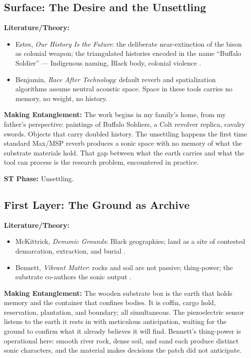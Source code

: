 \medskip

\subsection*{Surface: The Desire and the Unsettling}

\noindent\textbf{Literature/Theory:}
\begin{itemize}[noitemsep]
    \item Estes, \textit{Our History Is the Future}: the deliberate near-extinction of the bison as colonial weapon; the triangulated histories encoded in the name ``Buffalo Soldier'' — Indigenous naming, Black body, colonial violence \parencite{Estes_2019}.
    \item Benjamin, \textit{Race After Technology}: default reverb and spatialization algorithms assume neutral acoustic space. Space in these tools carries no memory, no weight, no history.
\end{itemize}

\noindent\textbf{Making Entanglement:} The work begins in my family's home, from my father's perspective: paintings of Buffalo Soldiers, a Colt revolver replica, cavalry swords. Objects that carry doubled history. The unsettling happens the first time standard Max/MSP reverb produces a sonic space with no memory of what the substrate materials hold. That gap between what the earth carries and what the tool can process is the research problem, encountered in practice.

\noindent\textbf{ST Phase:} Unsettling.

\medskip

\subsection*{First Layer: The Ground as Archive}

\noindent\textbf{Literature/Theory:}
\begin{itemize}[noitemsep]
    \item McKittrick, \textit{Demonic Grounds}: Black geographies; land as a site of contested demarcation, extraction, and burial \parencite{McKittrick_2006}.
    \item Bennett, \textit{Vibrant Matter}: rocks and soil are not passive; thing-power; the substrate co-authors the sonic output \parencite{Bennett_2010}.
\end{itemize}

\noindent\textbf{Making Entanglement:} The wooden substrate box is the earth that holds memory and the container that confines bodies. It is coffin, cargo hold, reservation, plantation, and boundary; all simultaneous. The piezoelectric sensor listens to the earth it rests in with meticulous anticipation, waiting for the ground to confirm what it already believes it will find. Bennett's thing-power is operational here: smooth river rock, dense soil, and sand each produce distinct sonic characters, and the material makes decisions the patch did not anticipate.

